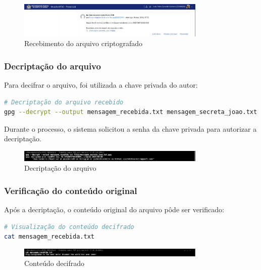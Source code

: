 \begin{figure}[htb]
    \centering
    \includegraphics[width=0.8\textwidth]{images/10-recebimento_arquivo.jpg}
    \caption{Recebimento do arquivo criptografado}
    \label{fig:recebimento-arquivo}
\end{figure}

\subsubsection{Decriptação do arquivo}
Para decifrar o arquivo, foi utilizada a chave privada do autor:

\begin{lstlisting}[language=bash]
# Decriptação do arquivo recebido
gpg --decrypt --output mensagem_recebida.txt mensagem_secreta_joao.txt.gpg
\end{lstlisting}

Durante o processo, o sistema solicitou a senha da chave privada para autorizar a decriptação.

\begin{figure}[htb]
    \centering
    \includegraphics[width=0.8\textwidth]{images/10-decriptacao_arquivo.jpg}
    \caption{Decriptação do arquivo}
    \label{fig:decriptacao-arquivo}
\end{figure}

\subsubsection{Verificação do conteúdo original}
Após a decriptação, o conteúdo original do arquivo pôde ser verificado:

\begin{lstlisting}[language=bash]
# Visualização do conteúdo decifrado
cat mensagem_recebida.txt
\end{lstlisting}

\begin{figure}[htb]
    \centering
    \includegraphics[width=0.8\textwidth]{images/10-conteudo_decifrado.jpg}
    \caption{Conteúdo decifrado}
    \label{fig:conteudo-decifrado}
\end{figure}

